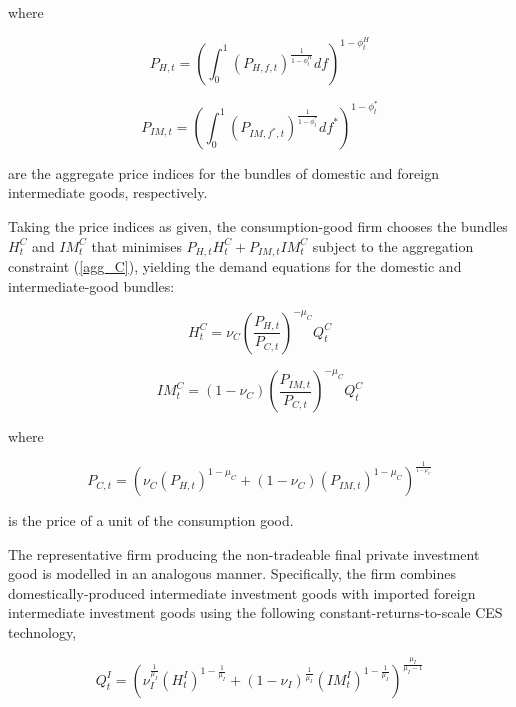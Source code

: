 \documentclass[a4paper,11pt]{article}
\numberwithin{equation}{section}
\begin{document}
	where
	
	\begin{equation}
	P_{H,t}=\left(\int_{0}^{1}\left(P_{H,f,t}\right)^{\frac{1}{1-\phi_t^H}}df\right)^{1-\phi_t^H}
	\end{equation}
	
	\begin{equation}
	P_{IM,t}=\left(\int_{0}^{1}\left(P_{IM,f^*,t}\right)^{\frac{1}{1-\phi_t^*}}df^*\right)^{1-\phi_t^*}
	\end{equation}
	
	are the aggregate price indices for the bundles of domestic and foreign intermediate goods, respectively.
	
	Taking the price indices as given, the consumption-good firm chooses the bundles $H_t^C$ and $IM_t^C$ that minimises $P_{H,t}H_t^C+P_{IM,t}IM_t^C$ subject to the aggregation constraint (\ref{agg_C}), yielding the demand equations for the domestic and intermediate-good bundles:
	
	\begin{equation} \label{demand_h}
	H_t^C=\nu_{C}\left(\frac{P_{H,t}}{P_{C,t}}\right)^{-\mu_C}Q_t^C
	\end{equation}
	
	\begin{equation} \label{demand_im}
	IM_t^C=(1-\nu_{C})\left(\frac{P_{IM,t}}{P_{C,t}}\right)^{-\mu_C}Q_t^C
	\end{equation}
	
	where
	
	\begin{equation} \label{agg_priceC}
	P_{C,t}=\left(\nu_{C}(P_{H,t})^{1-\mu_C}+(1-\nu_{C})\left(P_{IM,t}\right)^{1-\mu_C}\right)^{\frac{1}{^{1-\mu_C}}}
	\end{equation}
	
	is the price of a unit of the consumption good.
	
	The representative firm producing the non-tradeable final private investment good is modelled in an analogous manner. Specifically, the firm combines domestically-produced intermediate investment goods with imported foreign intermediate investment goods using the following constant-returns-to-scale CES technology,
	
	\begin{equation} \label{aggr_I}
	Q_t^I=\left(\nu_{I}^{\frac{1}{\mu_I}}\left(H_t^I\right)^{1-\frac{1}{\mu_I}} +(1-\nu_{I})^{\frac{1}{\mu_I}}\left(IM_t^I\right)^{1-\frac{1}{\mu_I}}\right)^{\frac{\mu_I}{\mu_I-1}}
	\end{equation}
	
\end{document}
